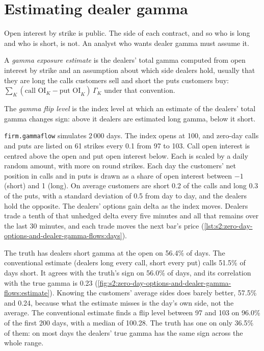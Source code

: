 \section{Estimating dealer gamma}

Open interest by strike is public. The side of each contract, and so who is long and who is short, is not. An analyst who wants dealer gamma must
assume it.

\begin{definition}\label{def:s2:zero-day-options-and-dealer-gamma-flows:gex}
A \emph{gamma exposure estimate} is the dealers' total gamma computed from open interest by strike and an assumption
about which side dealers hold, usually that they are long the calls customers sell and short the puts customers buy: $\sum_K (\text{call OI}_K -
\text{put OI}_K)\,\Gamma_K$ under that convention.
\end{definition}

\begin{definition}\label{def:s2:zero-day-options-and-dealer-gamma-flows:flip}
The \emph{gamma flip level} is the index level at which an estimate of the dealers' total gamma changes sign: above it
dealers are estimated long gamma, below it short.
\end{definition}

\texttt{firm.gammaflow} simulates 2\,000 days. The index opens at 100, and zero-day calls and puts are listed on 61 strikes every 0.1 from 97 to 103.
Call open interest is centred above the open and put open interest below. Each is scaled by a daily random amount, with more on round strikes. Each
day the customers' net position in calls and in puts is drawn as a share of open interest between $-1$ (short) and 1 (long). On average customers
are short 0.2 of the calls and long 0.3 of the puts, with a standard deviation of 0.5 from day to day, and the dealers hold the opposite. The dealers'
options gain delta as the index moves. Dealers trade a tenth of that unhedged delta every five minutes and all that remains over the last 30 minutes,
and each trade moves the next bar's price (\cref{lst:s2:zero-day-options-and-dealer-gamma-flows:days}).

The truth has dealers short gamma at the open on 56.4\% of days. The conventional estimate (dealers long every call, short every put) calls 51.5\% of
days short. It agrees with the truth's sign on 56.0\% of days, and its correlation with the true gamma is 0.23
(\cref{fig:s2:zero-day-options-and-dealer-gamma-flows:estimate}). Knowing the customers' average sides does barely better, 57.5\% and 0.24, because
what the estimate misses is the day's own side, not the average. The conventional estimate finds a flip level between 97 and 103 on 96.0\% of the
first 200 days, with a median of 100.28. The truth has one on only 36.5\% of them: on most days the dealers' true gamma has the same sign across the
whole range.

